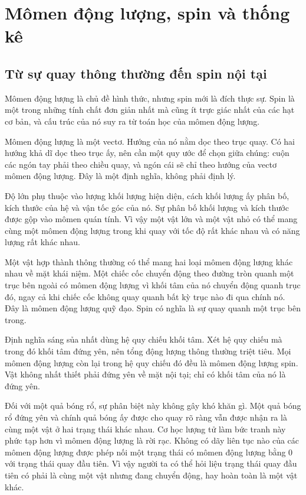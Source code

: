 \chapter{Mômen động lượng, spin và thống kê}

\section{Từ sự quay thông thường đến spin nội tại}

Mômen động lượng là chủ đề hình thức, nhưng spin mới là đích thực sự. Spin là một trong những tính chất đơn giản nhất mà cũng ít trực giác nhất của các hạt cơ bản, và cấu trúc của nó suy ra từ toán học của mômen động lượng.

Mômen động lượng là một vectơ. Hướng của nó nằm dọc theo trục quay. Có hai hướng khả dĩ dọc theo trục ấy, nên cần một quy ước để chọn giữa chúng: cuộn các ngón tay phải theo chiều quay, và ngón cái sẽ chỉ theo hướng của vectơ mômen động lượng. Đây là một định nghĩa, không phải định lý.

Độ lớn phụ thuộc vào lượng khối lượng hiện diện, cách khối lượng ấy phân bố, kích thước của hệ và vận tốc góc của nó. Sự phân bố khối lượng và kích thước được gộp vào mômen quán tính. Vì vậy một vật lớn và một vật nhỏ có thể mang cùng một mômen động lượng trong khi quay với tốc độ rất khác nhau và có năng lượng rất khác nhau.

Một vật hợp thành thông thường có thể mang hai loại mômen động lượng khác nhau về mặt khái niệm. Một chiếc cốc chuyển động theo đường tròn quanh một trục bên ngoài có mômen động lượng vì khối tâm của nó chuyển động quanh trục đó, ngay cả khi chiếc cốc không quay quanh bất kỳ trục nào đi qua chính nó. Đây là mômen động lượng quỹ đạo. Spin có nghĩa là sự quay quanh một trục bên trong.

Định nghĩa sáng sủa nhất dùng hệ quy chiếu khối tâm. Xét hệ quy chiếu mà trong đó khối tâm đứng yên, nên tổng động lượng thông thường triệt tiêu. Mọi mômen động lượng còn lại trong hệ quy chiếu đó đều là mômen động lượng spin. Vật không nhất thiết phải đứng yên về mặt nội tại; chỉ có khối tâm của nó là đứng yên.

Đối với một quả bóng rổ, sự phân biệt này không gây khó khăn gì. Một quả bóng rổ đứng yên và chính quả bóng ấy được cho quay rõ ràng vẫn được nhận ra là cùng một vật ở hai trạng thái khác nhau. Cơ học lượng tử làm bức tranh này phức tạp hơn vì mômen động lượng là rời rạc. Không có dãy liên tục nào của các mômen động lượng được phép nối một trạng thái có mômen động lượng bằng 0 với trạng thái quay đầu tiên. Vì vậy người ta có thể hỏi liệu trạng thái quay đầu tiên có phải là cùng một vật nhưng đang chuyển động, hay hoàn toàn là một vật khác.

